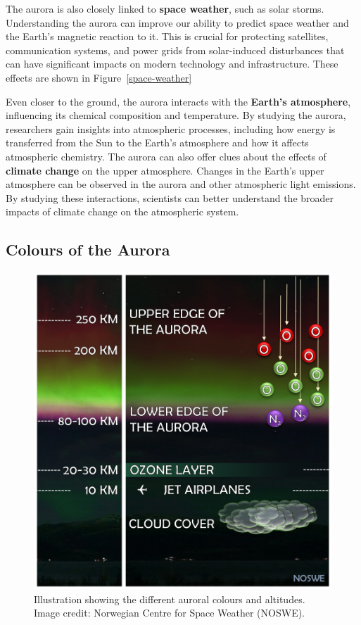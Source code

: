 \documentclass{article}
\begin{document}
The aurora is also closely linked to \textbf{space weather}, such as solar storms. Understanding the aurora can improve our ability to predict space weather and the Earth's magnetic reaction to it. This is crucial for protecting satellites, communication systems, and power grids from solar-induced disturbances that can have significant impacts on modern technology and infrastructure. These effects are shown in Figure~\ref{space-weather}

Even closer to the ground, the aurora interacts with the \textbf{Earth's atmosphere}, influencing its chemical composition and temperature. By studying the aurora, researchers gain insights into atmospheric processes, including how energy is transferred from the Sun to the Earth's atmosphere and how it affects atmospheric chemistry. The aurora can also offer clues about the effects of \textbf{climate change} on the upper atmosphere. Changes in the Earth's upper atmosphere can be observed in the aurora and other atmospheric light emissions. By studying these interactions, scientists can better understand the broader impacts of climate change on the atmospheric system.




\subsection{Colours of the Aurora}


\begin{figure}[h!]
  \includegraphics[width=\linewidth]{Fig3_Colours.png}
  \caption{Illustration showing the different auroral colours and altitudes. Image credit: Norwegian Centre for Space Weather (NOSWE). }
  \label{colours}
  
\end{figure}
\end{document}
